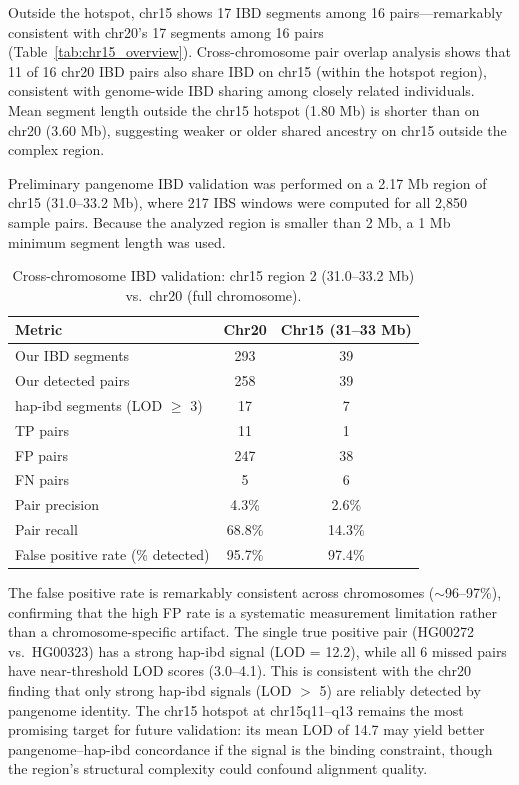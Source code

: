 \documentclass[11pt]{article}
\begin{document}
Outside the hotspot, chr15 shows 17 IBD segments among 16 pairs---remarkably consistent with chr20's 17 segments among 16 pairs (Table~\ref{tab:chr15_overview}). Cross-chromosome pair overlap analysis shows that 11 of 16 chr20 IBD pairs also share IBD on chr15 (within the hotspot region), consistent with genome-wide IBD sharing among closely related individuals. Mean segment length outside the chr15 hotspot (1.80 Mb) is shorter than on chr20 (3.60 Mb), suggesting weaker or older shared ancestry on chr15 outside the complex region.

Preliminary pangenome IBD validation was performed on a 2.17 Mb region of chr15 (31.0--33.2 Mb), where 217 IBS windows were computed for all 2,850 sample pairs. Because the analyzed region is smaller than 2 Mb, a 1 Mb minimum segment length was used.

\begin{table}[ht]
\centering
\caption{Cross-chromosome IBD validation: chr15 region 2 (31.0--33.2 Mb) vs.\ chr20 (full chromosome).}
\label{tab:chr15_validation}
\begin{tabular}{lcc}
\hline
\textbf{Metric} & \textbf{Chr20} & \textbf{Chr15 (31--33 Mb)} \\
\hline
Our IBD segments & 293 & 39 \\
Our detected pairs & 258 & 39 \\
hap-ibd segments (LOD $\geq$ 3) & 17 & 7 \\
TP pairs & 11 & 1 \\
FP pairs & 247 & 38 \\
FN pairs & 5 & 6 \\
Pair precision & 4.3\% & 2.6\% \\
Pair recall & 68.8\% & 14.3\% \\
False positive rate (\% detected) & 95.7\% & 97.4\% \\
\hline
\end{tabular}
\end{table}

The false positive rate is remarkably consistent across chromosomes ($\sim$96--97\%), confirming that the high FP rate is a systematic measurement limitation rather than a chromosome-specific artifact. The single true positive pair (HG00272 vs.\ HG00323) has a strong hap-ibd signal (LOD = 12.2), while all 6 missed pairs have near-threshold LOD scores (3.0--4.1). This is consistent with the chr20 finding that only strong hap-ibd signals (LOD $>$ 5) are reliably detected by pangenome identity. The chr15 hotspot at chr15q11--q13 remains the most promising target for future validation: its mean LOD of 14.7 may yield better pangenome--hap-ibd concordance if the signal is the binding constraint, though the region's structural complexity could confound alignment quality.
\end{document}
